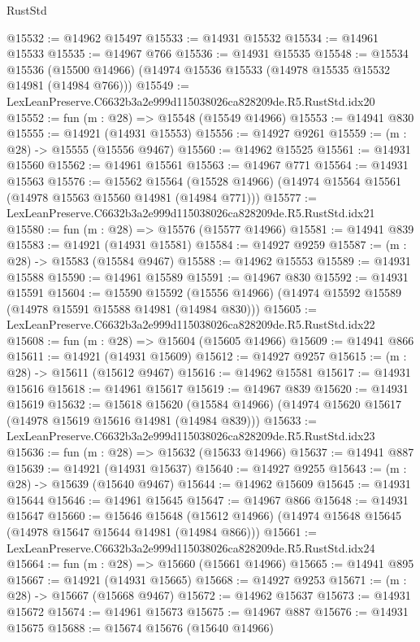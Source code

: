\begin{lexlean}{RustStd}
\begin{coremodule}
@15532 := @14962 @15497
@15533 := @14931 @15532
@15534 := @14961 @15533
@15535 := @14967 @766
@15536 := @14931 @15535
@15548 := @15534
    @15536
    (@15500 @14966)
    (@14974 @15536 @15533 (@14978 @15535 @15532 @14981 (@14984 @766)))
@15549 := LexLeanPreserve.C6632b3a2e999d115038026ca828209de.R5.RustStd.idx20
@15552 := fun (m : @28) => @15548 (@15549 @14966)
@15553 := @14941 @830
@15555 := @14921 (@14931 @15553)
@15556 := @14927 @9261
@15559 := (m : @28) -> @15555 (@15556 @9467)
@15560 := @14962 @15525
@15561 := @14931 @15560
@15562 := @14961 @15561
@15563 := @14967 @771
@15564 := @14931 @15563
@15576 := @15562
    @15564
    (@15528 @14966)
    (@14974 @15564 @15561 (@14978 @15563 @15560 @14981 (@14984 @771)))
@15577 := LexLeanPreserve.C6632b3a2e999d115038026ca828209de.R5.RustStd.idx21
@15580 := fun (m : @28) => @15576 (@15577 @14966)
@15581 := @14941 @839
@15583 := @14921 (@14931 @15581)
@15584 := @14927 @9259
@15587 := (m : @28) -> @15583 (@15584 @9467)
@15588 := @14962 @15553
@15589 := @14931 @15588
@15590 := @14961 @15589
@15591 := @14967 @830
@15592 := @14931 @15591
@15604 := @15590
    @15592
    (@15556 @14966)
    (@14974 @15592 @15589 (@14978 @15591 @15588 @14981 (@14984 @830)))
@15605 := LexLeanPreserve.C6632b3a2e999d115038026ca828209de.R5.RustStd.idx22
@15608 := fun (m : @28) => @15604 (@15605 @14966)
@15609 := @14941 @866
@15611 := @14921 (@14931 @15609)
@15612 := @14927 @9257
@15615 := (m : @28) -> @15611 (@15612 @9467)
@15616 := @14962 @15581
@15617 := @14931 @15616
@15618 := @14961 @15617
@15619 := @14967 @839
@15620 := @14931 @15619
@15632 := @15618
    @15620
    (@15584 @14966)
    (@14974 @15620 @15617 (@14978 @15619 @15616 @14981 (@14984 @839)))
@15633 := LexLeanPreserve.C6632b3a2e999d115038026ca828209de.R5.RustStd.idx23
@15636 := fun (m : @28) => @15632 (@15633 @14966)
@15637 := @14941 @887
@15639 := @14921 (@14931 @15637)
@15640 := @14927 @9255
@15643 := (m : @28) -> @15639 (@15640 @9467)
@15644 := @14962 @15609
@15645 := @14931 @15644
@15646 := @14961 @15645
@15647 := @14967 @866
@15648 := @14931 @15647
@15660 := @15646
    @15648
    (@15612 @14966)
    (@14974 @15648 @15645 (@14978 @15647 @15644 @14981 (@14984 @866)))
@15661 := LexLeanPreserve.C6632b3a2e999d115038026ca828209de.R5.RustStd.idx24
@15664 := fun (m : @28) => @15660 (@15661 @14966)
@15665 := @14941 @895
@15667 := @14921 (@14931 @15665)
@15668 := @14927 @9253
@15671 := (m : @28) -> @15667 (@15668 @9467)
@15672 := @14962 @15637
@15673 := @14931 @15672
@15674 := @14961 @15673
@15675 := @14967 @887
@15676 := @14931 @15675
@15688 := @15674
    @15676
    (@15640 @14966)

\end{coremodule}
\end{lexlean}
